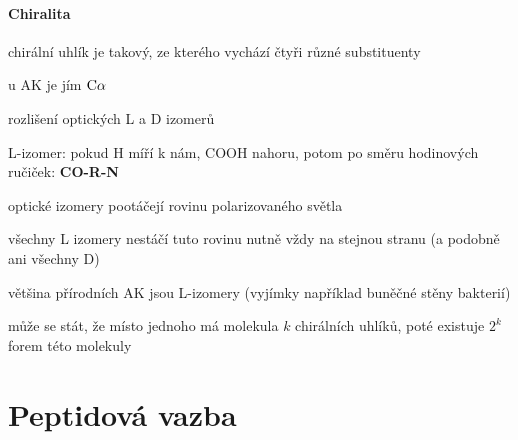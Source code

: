 \documentclass[DIV=8]{scrreprt}
\begin{document}
\paragraph{Chiralita}
\begin{myItemize}[nosep]
    \item chirální uhlík je takový, ze kterého vychází čtyři různé substituenty
\begin{myItemize}[nosep]
    \item u AK je jím \(\ce{C\alpha}\)
\end{myItemize}

    \item rozlišení optických L a D izomerů
\begin{myItemize}[nosep]
    \item L-izomer: pokud H míří k nám, COOH nahoru, potom po směru hodinových ručiček: \textbf{CO-R-N}
    \item optické izomery pootáčejí rovinu polarizovaného světla
    \item všechny L izomery nestáčí tuto rovinu nutně vždy na stejnou stranu (a podobně ani všechny D)
\end{myItemize}

    \item většina přírodních AK jsou L-izomery (vyjímky například buněčné stěny bakterií)
    \item může se stát, že místo jednoho má molekula \(k\) chirálních uhlíků, poté existuje \(2^k\) forem této molekuly
\end{myItemize}



\section{Peptidová vazba} \label{Peptidová vazba} \FloatBarrier
\end{document}
